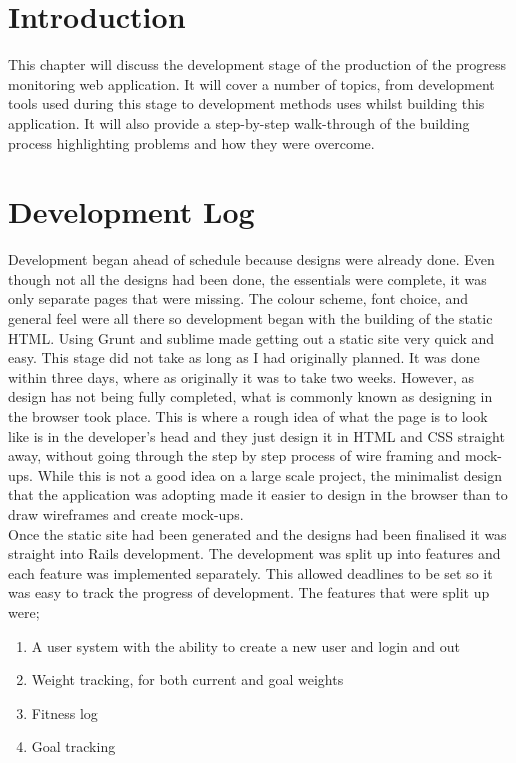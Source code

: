 \section{Introduction}
This chapter will discuss the development stage of the production of the progress monitoring web application. It will cover a number of topics, from development tools used during this stage to development methods uses whilst building this application. It will also provide a step-by-step walk-through of the building process highlighting problems and how they were overcome.\\

\section{Development Log}
Development began ahead of schedule because designs were already done. Even though not all the designs had been done, the essentials were complete, it was only separate pages that were missing. The colour scheme, font choice, and general feel were all there so development began with the building of the static HTML. Using Grunt \citep{grunt:2013} and sublime made getting out a static site very quick and easy. This stage did not take as long as I had originally planned. It was done within three days, where as originally it was to take two weeks. However, as design has not being fully completed, what is commonly known as designing in the browser took place. This is where a rough idea of what the page is to look like is in the developer's head and they just design it in HTML and CSS  straight away, without going through the step by step process of wire framing and mock-ups. While this is not a good idea on a large scale project, the minimalist design that the application was adopting made it easier to design in the browser than to draw wireframes and create mock-ups.\\

Once the static site had been generated and the designs had been finalised it was straight into Rails development. The development was split up into features and each feature was implemented separately. This allowed deadlines to be set so it was easy to track the progress of development. The features that were split up were;

\begin{enumerate}
\item A user system with the ability to create a new user and login and out
\item Weight tracking, for both current and goal weights
\item Fitness log
\item Goal tracking
\end{enumerate}

